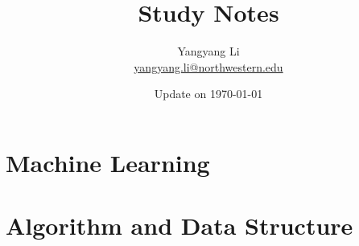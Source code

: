 \documentclass{scinote}
\begin{document}
\title{\bf \huge Study Notes}
\author{Yangyang Li \\ \href{mailto:yangyang.li@northwestern.edu}{yangyang.li@northwestern.edu}}

\date{Update on \today}
\maketitle
\setcounter{tocdepth}{2}
\setcounter{minitocdepth}{1}

\begin{multicols}{2}
	\dominitoc%
	\adjustmtc[2]%
	\tableofcontents
	\label{toc-contents}
\end{multicols}

\listoffigures
\begin{multicols}{2}
	\listoftheorems[ignoreall,show={theorem}]
\end{multicols}

\renewcommand{\listtheoremname}{List of Definitions}
\begin{multicols}{2}
	\listoftheorems[ignoreall,show={definition}]
\end{multicols}

\printglossaries




\part{Machine Learning}



\part{Algorithm and Data Structure}

\end{document}
